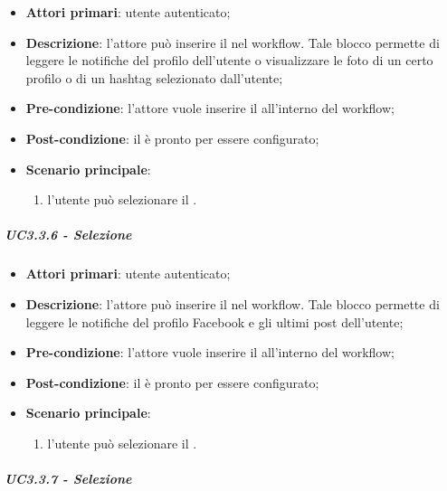 \begin{itemize}
\item \textbf{Attori primari}: utente autenticato;

\item \textbf{Descrizione}: l'attore può inserire il \BInstagram{} nel workflow. Tale blocco permette di leggere le notifiche del profilo dell'utente o visualizzare le foto di un certo profilo o di un hashtag selezionato dall'utente;

\item \textbf{Pre-condizione}: l'attore vuole inserire il \BInstagram{} all'interno del workflow;

\item \textbf{Post-condizione}: il \BInstagram{} è pronto per essere configurato;

\item \textbf{Scenario principale}:
\begin{enumerate}
\item l'utente può selezionare il \BInstagram{}.

\end{enumerate}
\end{itemize}

\subparagraph{UC3.3.6 - Selezione \BFacebook{}}

\begin{itemize}
\item \textbf{Attori primari}: utente autenticato;

\item \textbf{Descrizione}: l'attore può inserire il \BFacebook{} nel workflow. Tale blocco permette di leggere le notifiche del profilo Facebook  e gli ultimi post dell'utente;

\item \textbf{Pre-condizione}: l'attore vuole inserire il \BFacebook{} all'interno del workflow;

\item \textbf{Post-condizione}: il \BFacebook{} è pronto per essere configurato;

\item \textbf{Scenario principale}:
\begin{enumerate}
\item l'utente può selezionare il \BFacebook{}.

\end{enumerate}
\end{itemize}

\subparagraph{UC3.3.7 - Selezione \BMessenger{}}

